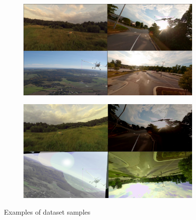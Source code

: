 \documentclass[12pt]{article}
\begin{document}
\begin{figure}
\centering
\begin{subfigure}{.6\linewidth}
  \includegraphics[width=.75\linewidth]{dataset1.png}
  \caption{}
  \label{fig:sub1}
\end{subfigure}%
\begin{subfigure}{.6\linewidth}
  \includegraphics[width=.75\linewidth]{dataset2.png}
  \caption{}
  \label{fig:sub2}
\end{subfigure}
\caption{Examples of dataset samples}
\label{fig:test}
\end{figure}
\FloatBarrier
\end{document}

